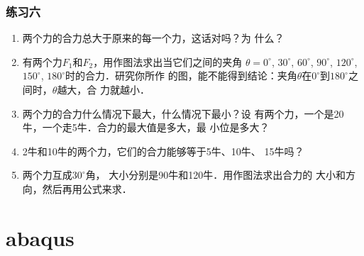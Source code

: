 \subsection*{练习六}
\begin{enumerate}
\item 两个力的合力总大于原来的每一个力，这话对吗？为
什么？

\item 有两个力$F_1$和$F_2$，用作图法求出当它们之间的夹角
$\theta =0^\circ$, $30^\circ$, $60^\circ$, $90^\circ$, $120^\circ$, $150^\circ$, $180^\circ$时的合力．研究你所作
的图，能不能得到结论：夹角$\theta$在$0^\circ$到$180^\circ$之间时，$\theta $越大，合
力就越小．
\item 两个力的合力什么情况下最大，什么情况下最小？设
有两个力，一个是20牛，一个走5牛．合力的最大值是多大，最
小位是多大？
\item 2牛和10牛的两个力，它们的合力能够等于5牛、10牛、
15牛吗？
\item   两个力互成$30^\circ$角， 大小分别是90牛和120牛．用作图法求出合力的
大小和方向，然后再用公式来求．
\end{enumerate}



\makeatletter
%
%

\makeatother


\chapter*{abaqus}

